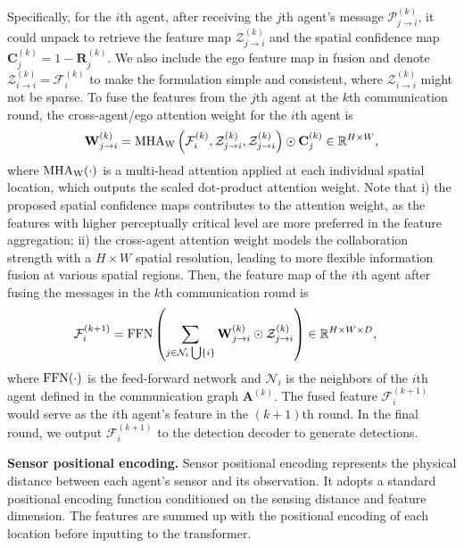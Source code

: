 Specifically, for the $i$th agent, after receiving the $j$th agent's message $\mathcal{P}_{j\rightarrow i}^{(k)}$, it could unpack to retrieve the feature map $\mathcal{Z}^{(k)}_{j\rightarrow i}$ and the spatial confidence map $\mathbf{C}^{(k)}_j = 1 - \mathbf{R}^{(k)}_j$. We also include the ego feature map in fusion and denote $\mathcal{Z}^{(k)}_{i\rightarrow i} = \mathcal{F}_{i}^{(k)}$ to make the formulation simple and consistent, where $\mathcal{Z}^{(k)}_{i\rightarrow i}$ might not be sparse. To fuse the features from the $j$th agent at the $k$th communication round, the cross-agent/ego attention weight for the $i$th agent is
\begin{equation}
    \label{eq:attention}
    \mathbf{W}_{j\rightarrow i}^{(k)} = {\rm MHA}_{\rm W}\left(\mathcal{F}_{i}^{(k)}, \mathcal{Z}_{j\rightarrow i}^{(k)}, \mathcal{Z}_{j\rightarrow i}^{(k)}\right) \odot  \mathbf{C}^{(k)}_j \in \mathbb{R}^{H\times W},
\end{equation}
where ${\rm MHA}_{\rm W}(\cdot)$ is a multi-head attention applied at each individual spatial location, which outputs the scaled dot-product attention weight. Note that i) the proposed spatial confidence maps contributes to the attention weight, as the features with higher perceptually critical level are more preferred in the feature aggregation; ii) the cross-agent attention weight models the collaboration strength with a $H\times W$ spatial resolution, leading to more flexible information fusion at various spatial regions. Then, the feature map of the $i$th agent after fusing the messages in the $k$th communication round is
\begin{align*}
\vspace{-4mm}
    \mathcal{F}_{i}^{(k+1)} &= {\rm FFN} \left( \sum_{j\in  \mathcal{N}_i\bigcup \{i\} } {\mathbf{W}}_{j\rightarrow i}^{(k)} \odot \mathcal{Z}_{j\rightarrow i}^{(k)}   \right) \in \mathbb{R}^{H\times W\times D},
\vspace{-4mm}
\end{align*}
where ${\rm FFN}(\cdot)$ is the feed-forward network and $\mathcal{N}_i$ is the neighbors of the $i$th agent defined in the communication graph $\mathbf{A}^{(k)}$. The fused feature $\mathcal{F}_{i}^{(k+1)}$ would serve as the $i$th agent's feature in the $(k+1)$th round. In the final round, we output $\mathcal{F}_{i}^{(k+1)}$ to the detection decoder to generate detections.

\textbf{Sensor positional encoding.} Sensor positional encoding represents the physical distance between each agent's sensor and its observation.  It adopts a standard positional encoding function conditioned on the sensing distance and feature dimension. The features are summed up with the positional encoding of each location before inputting to the transformer.

